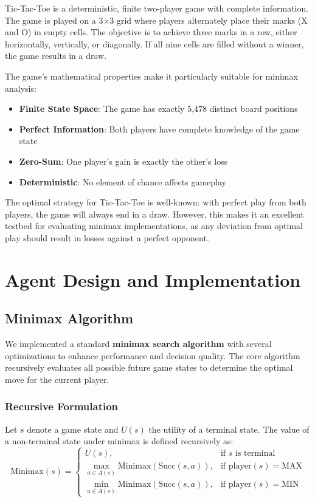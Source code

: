 \documentclass[12pt]{article}
\begin{document}
Tic-Tac-Toe is a deterministic, finite two-player game with complete information. The game is played on a 3×3 grid where players alternately place their marks (X and O) in empty cells. The objective is to achieve three marks in a row, either horizontally, vertically, or diagonally. If all nine cells are filled without a winner, the game results in a draw.

The game's mathematical properties make it particularly suitable for minimax analysis:
\begin{itemize}
    \item \textbf{Finite State Space}: The game has exactly 5,478 distinct board positions
    \item \textbf{Perfect Information}: Both players have complete knowledge of the game state
    \item \textbf{Zero-Sum}: One player's gain is exactly the other's loss
    \item \textbf{Deterministic}: No element of chance affects gameplay
\end{itemize}

The optimal strategy for Tic-Tac-Toe is well-known: with perfect play from both players, the game will always end in a draw. However, this makes it an excellent testbed for evaluating minimax implementations, as any deviation from optimal play should result in losses against a perfect opponent.

\section{Agent Design and Implementation}

\subsection{Minimax Algorithm}

We implemented a standard \textbf{minimax search algorithm} with several optimizations to enhance performance and decision quality. The core algorithm recursively evaluates all possible future game states to determine the optimal move for the current player.

\subsubsection*{Recursive Formulation}

Let \( s \) denote a game state and \( U(s) \) the utility of a terminal state. The value of a non-terminal state under minimax is defined recursively as:
\[
\text{Minimax}(s) =
\begin{cases}
U(s), & \text{if } s \text{ is terminal} \\
\max_{a \in A(s)} \text{Minimax}(\text{Succ}(s, a)), & \text{if } \text{player}(s) = \text{MAX} \\
\min_{a \in A(s)} \text{Minimax}(\text{Succ}(s, a)), & \text{if } \text{player}(s) = \text{MIN}
\end{cases}
\]
\end{document}
